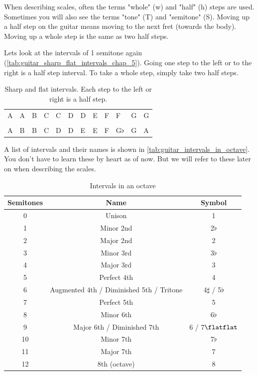 When describing scales, often the terms "whole" (w) and "half" (h) steps are used. Sometimes you will also see the terms "tone" (T) and "semitone" (S). Moving up a half step on the guitar means moving to the next fret (towards the body). Moving up a whole step is the same as two half steps.

Lets look at the intervals of 1 semitone again (\autoref{tab:guitar_sharp_flat_intervals_chap_5}). Going one step to the left or to the right is a half step interval. To take a whole step, simply take two half steps.

\begin{table}[h]
	\centering
	\begin{tabular}{*{12}{P{5mm}}}
		\large{A} & \large{A\sharp} & \large{B} & \large{C} & \large{C\sharp} & \large{D} & \large{D\sharp} & \large{E} & \large{F} & \large{F\sharp} & \large{G} & \large{G\sharp} \\ \\
		\large{A} & \large{B\flat} & \large{B} & \large{C} & \large{D\flat} & \large{D} & \large{E\flat} & \large{E} & \large{F} & \large{G$\flat$}& \large{G} & \large{A\flat}
	\end{tabular}
	\caption{Sharp and flat intervals. Each step to the left or right is a half step.}
	\label{tab:guitar_sharp_flat_intervals_chap_5}
\end{table}

A list of intervals and their names is shown in \autoref{tab:guitar_intervals_in_octave}. You don't have to learn these by heart as of now. But we will refer to these later on when describing the scales.

\begin{table}[h]
	\centering
	\begin{tabular}{|c|c|c|}
		\hline
		\textbf{Semitones} & \textbf{Name} & \textbf{Symbol} \\
		\hline
		\hline
		0 & Unison & 1 \\
		\hline
		1 & Minor 2nd & 2$\flat$ \\
		\hline
		2 & Major 2nd & 2 \\
		\hline
		3 & Minor 3rd & 3$\flat$ \\
		\hline
		4 & Major 3rd & 3 \\
		\hline
		5 & Perfect 4th& 4 \\
		\hline
		6 & Augmented 4th / Diminished 5th / Tritone & 4$\sharp$ / 5$\flat$ \\
		\hline
		7 & Perfect 5th & 5 \\
		\hline
		8 & Minor 6th & 6$\flat$ \\
		\hline
		9 & Major 6th / Diminished 7th & 6 / 7$\flatflat$ \\
		\hline
		10 & Minor 7th & 7$\flat$ \\
		\hline
		11 & Major 7th & 7 \\
		\hline
		12 & 8th (octave)& 8 \\
		\hline
	\end{tabular}
	\caption{Intervals in an octave}
	\label{tab:guitar_intervals_in_octave}
\end{table}

